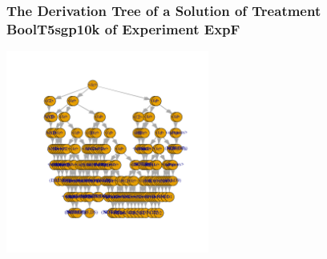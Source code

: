  \begin{frame}
 \frametitle{ The Derivation Tree of a Solution of Treatment BoolT5sgp10k of Experiment ExpF }
 \begin{center}
\includegraphics[width=0.5\textwidth, angle=0]
{ExpFDerivationTreeFigure008.pdf}
 \end{center}
 \label{report/ExpFDerivationTreeFigure008.pdf}  
 \end{frame}

